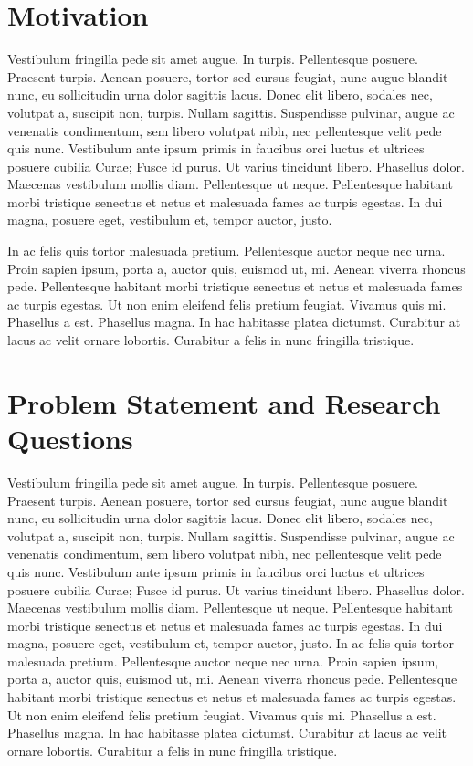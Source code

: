 \section{Motivation}

Vestibulum fringilla pede sit amet augue. In turpis. Pellentesque posuere. Praesent turpis. Aenean posuere, tortor sed cursus feugiat, nunc augue blandit nunc, eu sollicitudin urna dolor sagittis lacus. Donec elit libero, sodales nec, volutpat a, suscipit non, turpis. Nullam sagittis. Suspendisse pulvinar, augue ac venenatis condimentum, sem libero volutpat nibh, nec pellentesque velit pede quis nunc. Vestibulum ante ipsum primis in faucibus orci luctus et ultrices posuere cubilia Curae; Fusce id purus. Ut varius tincidunt libero. Phasellus dolor. Maecenas vestibulum mollis diam. Pellentesque ut neque. Pellentesque habitant morbi tristique senectus et netus et malesuada fames ac turpis egestas. In dui magna, posuere eget, vestibulum et, tempor auctor, justo. 

In ac felis quis tortor malesuada pretium. Pellentesque auctor neque nec urna. Proin sapien ipsum, porta a, auctor quis, euismod ut, mi. Aenean viverra rhoncus pede. Pellentesque habitant morbi tristique senectus et netus et malesuada fames ac turpis egestas. Ut non enim eleifend felis pretium feugiat. Vivamus quis mi. Phasellus a est. Phasellus magna. In hac habitasse platea dictumst. Curabitur at lacus ac velit ornare lobortis. Curabitur a felis in nunc fringilla tristique. 

\section{Problem Statement and Research Questions}

Vestibulum fringilla pede sit amet augue. In turpis. Pellentesque posuere. Praesent turpis. Aenean posuere, tortor sed cursus feugiat, nunc augue blandit nunc, eu sollicitudin urna dolor sagittis lacus. Donec elit libero, sodales nec, volutpat a, suscipit non, turpis. Nullam sagittis. Suspendisse pulvinar, augue ac venenatis condimentum, sem libero volutpat nibh, nec pellentesque velit pede quis nunc. Vestibulum ante ipsum primis in faucibus orci luctus et ultrices posuere cubilia Curae; Fusce id purus. Ut varius tincidunt libero. Phasellus dolor. Maecenas vestibulum mollis diam. Pellentesque ut neque. Pellentesque habitant morbi tristique senectus et netus et malesuada fames ac turpis egestas. In dui magna, posuere eget, vestibulum et, tempor auctor, justo. In ac felis quis tortor malesuada pretium. Pellentesque auctor neque nec urna. Proin sapien ipsum, porta a, auctor quis, euismod ut, mi. Aenean viverra rhoncus pede. Pellentesque habitant morbi tristique senectus et netus et malesuada fames ac turpis egestas. Ut non enim eleifend felis pretium feugiat. Vivamus quis mi. Phasellus a est. Phasellus magna. In hac habitasse platea dictumst. Curabitur at lacus ac velit ornare lobortis. Curabitur a felis in nunc fringilla tristique.

